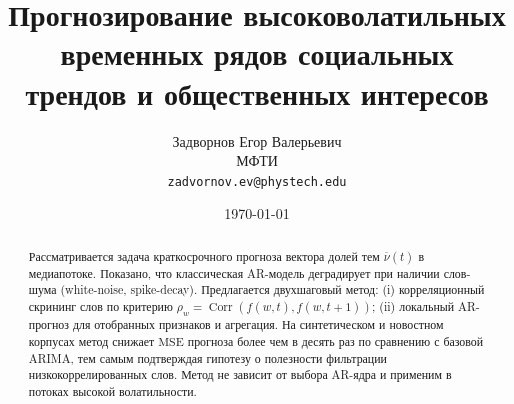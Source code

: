 \documentclass[14pt,a4paper]{article}
\title{Прогнозирование высоковолатильных временных рядов социальных трендов и общественных интересов}
\author{
  Задворнов Егор Валерьевич \\
  МФТИ \\
  \texttt{zadvornov.ev@phystech.edu} \\
\date{\today}
}
\begin{document}




% 
\setcounter{page}{2}

\begin{abstract}
Рассматривается задача краткосрочного прогноза вектора долей тем \(\overline{\nu}(t)\) в медиапотоке. Показано, что классическая AR-модель деградирует при наличии слов-шума (white-noise, spike-decay). Предлагается двухшаговый метод: (i) корреляционный скрининг слов по критерию \(\rho_w=\operatorname{Corr}(f(w,t),f(w,t+1))\); (ii) локальный AR-прогноз для отобранных признаков и агрегация. На синтетическом и новостном корпусах метод снижает \(\mathrm{MSE}\) прогноза более чем в десять раз по сравнению с базовой ARIMA, тем самым подтверждая гипотезу о полезности фильтрации низкокоррелированных слов. Метод не зависит от выбора AR-ядра и применим в потоках высокой волатильности.
\end{abstract}




\newpage
\tableofcontents
\clearpage %


\newpage

\end{document}
